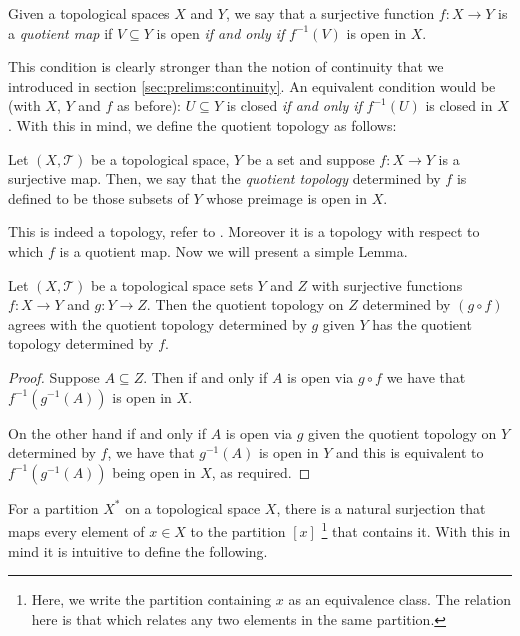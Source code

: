 \begin{defn}
  Given a topological spaces $X$ and  $Y$, we say that a surjective
  function $f:X \rightarrow Y$ is a \emph{quotient map} if $V
  \subseteq Y$ is open \emph{if and only if} $f^{-1}(V)$ is open in
  $X$.
\end{defn}

This condition is clearly stronger than the notion of continuity that
we introduced in section \ref{sec:prelims:continuity}. An equivalent
condition would be (with $X$, $Y$ and $f$ as before): $U \subseteq Y$
is closed \emph{if and only if} $f^{-1}(U)$ is closed in $X$. With
this in mind, we define the quotient topology as follows:

\begin{defn}
  Let $(X,\mathscr{T})$ be a topological space, $Y$ be a set and
  suppose $f: X \rightarrow Y$ is a surjective map. Then, we say that
  the \emph{quotient topology} determined by $f$ is defined to be
  those subsets of $Y$ whose preimage is open in $X$.
\end{defn}

This is indeed a topology, refer to \cite[p.~138]{munkres}. Moreover
it is a topology with respect to which $f$ is a quotient map. Now we
will present a simple Lemma. 

\begin{lem}
  \label{lem:prelims:compose}
  Let $(X, \mathscr{T})$ be a topological space sets $Y$ and $Z$ with
  surjective functions $f : X \rightarrow Y$ and $g : Y \rightarrow
  Z$. Then the quotient topology on $Z$ determined by $(g \circ f)$
  agrees with the quotient topology determined by $g$ given $Y$ has
  the quotient topology determined by $f$.
\end{lem}

\begin{proof}
  Suppose $A \subseteq Z$. Then if and only if $A$ is open via $g
  \circ f$ we have that $f^{-1}(g^{-1}(A))$ is open in $X$. 

  On the other hand if and only if $A$ is open via $g$ given the
  quotient topology on $Y$ determined by $f$, we have that $g^{-1}(A)$
  is open in $Y$ and this is equivalent to $f^{-1}(g^{-1}(A))$ being
  open in $X$, as required.
\end{proof}

For a partition $X^*$ on a topological space $X$, there is a natural
surjection that maps every element of $x \in X$ to the partition $[x]$
\footnote{Here, we write   the partition containing $x$ as an
  equivalence class. The relation here is that which relates any two
  elements in the same partition.} that contains it. With this in mind
it is intuitive to define the following.


